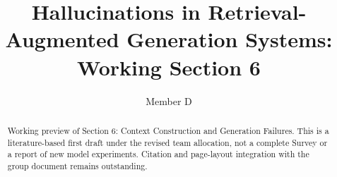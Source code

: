 \documentclass[manuscript,screen]{acmart}
\title{Hallucinations in Retrieval-Augmented Generation Systems:\\ Working Section 6}
\author{Member D}
\affiliation{\institution{Working draft}}
\begin{document}
\begin{abstract}
Working preview of Section 6: Context Construction and Generation Failures. This is a literature-based first draft under the revised team allocation, not a complete Survey or a report of new model experiments. Citation and page-layout integration with the group document remains outstanding.
\end{abstract}
\maketitle



\end{document}
